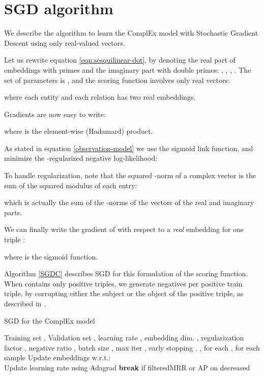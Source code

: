 \documentclass{article}
\begin{document}
\clearpage











\appendix


\section{SGD algorithm}
\label{app:sgd}
We describe the algorithm to learn the ComplEx model with Stochastic Gradient Descent using only real-valued vectors.

Let us rewrite equation \ref{eqn:sesquilinear-dot}, by denoting
the real part of embeddings with primes and the imaginary part with double primes: 
, , , .
The set of parameters is ,
and the scoring function involves only real vectors:



where each entity and each relation has two real embeddings. 


Gradients are now easy to write:




where  is the element-wise (Hadamard) product.


As stated in equation \ref{observation-model} we use the sigmoid link function, and minimize the -regularized negative log-likelihood:



To handle regularization, note that the squared -norm of a complex vector 
is the sum of the squared modulus of each entry:



which is actually the sum of the -norms of the vectors of the real and imaginary parts.

We can finally write the gradient of  with respect to a \emph{real} embedding  for
one triple :




where  is the sigmoid function.

Algorithm \ref{SGDC} describes SGD for this formulation of the
scoring function.
When  contains only positive triples,
we generate  negatives per positive train triple, by corrupting
either the subject or the object of the positive triple, as 
described in \citet{bordes2013translating}.


\begin{algorithm}[t]
\caption{SGD for the ComplEx model}
\label{SGDC}
\begin{algorithmic}
\INPUT Training set , Validation set , learning rate , embedding dim. , regularization factor , negative ratio , batch size , max iter , early stopping .
\STATE ,  for each 
\STATE ,  for each 
\FOR{}
    \FOR {}
        \STATE  sample
        \STATE Update embeddings w.r.t.:\\
        
        \STATE Update learning rate  using Adagrad
    \ENDFOR
    \IF{}
        \STATE \textbf{break} if filteredMRR or AP on  decreased
    \ENDIF
\ENDFOR
\end{algorithmic}
\end{algorithm}
\end{document}
